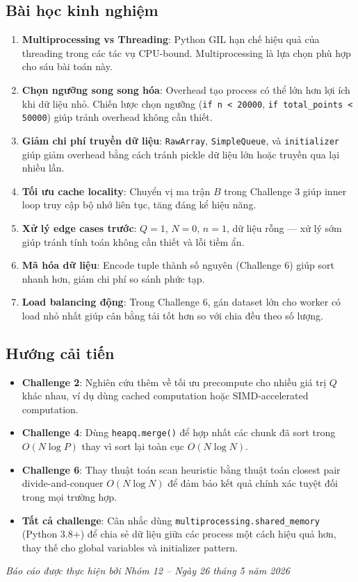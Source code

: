 \documentclass[12pt,a4paper]{article}
\begin{document}
\subsection{Bài học kinh nghiệm}

\begin{enumerate}
  \item \textbf{Multiprocessing vs Threading}: Python GIL hạn chế hiệu quả của threading trong các tác vụ CPU-bound. Multiprocessing là lựa chọn phù hợp cho sáu bài toán này.
  
  \item \textbf{Chọn ngưỡng song song hóa}: Overhead tạo process có thể lớn hơn lợi ích khi dữ liệu nhỏ. Chiến lược chọn ngưỡng (\texttt{if n < 20000}, \texttt{if total\_points < 50000}) giúp tránh overhead không cần thiết.
  
  \item \textbf{Giảm chi phí truyền dữ liệu}: \texttt{RawArray}, \texttt{SimpleQueue}, và \texttt{initializer} giúp giảm overhead bằng cách tránh pickle dữ liệu lớn hoặc truyền qua lại nhiều lần.
  
  \item \textbf{Tối ưu cache locality}: Chuyển vị ma trận $B$ trong Challenge 3 giúp inner loop truy cập bộ nhớ liên tục, tăng đáng kể hiệu năng.
  
  \item \textbf{Xử lý edge cases trước}: $Q=1$, $N=0$, $n=1$, dữ liệu rỗng — xử lý sớm giúp tránh tính toán không cần thiết và lỗi tiềm ẩn.
  
  \item \textbf{Mã hóa dữ liệu}: Encode tuple thành số nguyên (Challenge 6) giúp sort nhanh hơn, giảm chi phí so sánh phức tạp.
  
  \item \textbf{Load balancing động}: Trong Challenge 6, gán dataset lớn cho worker có load nhỏ nhất giúp cân bằng tải tốt hơn so với chia đều theo số lượng.
\end{enumerate}

\subsection{Hướng cải tiến}

\begin{itemize}
  \item \textbf{Challenge 2}: Nghiên cứu thêm về tối ưu precompute cho nhiều giá trị $Q$ khác nhau, ví dụ dùng cached computation hoặc SIMD-accelerated computation.
  \item \textbf{Challenge 4}: Dùng \texttt{heapq.merge()} để hợp nhất các chunk đã sort trong $O(N \log P)$ thay vì sort lại toàn cục $O(N \log N)$.
  \item \textbf{Challenge 6}: Thay thuật toán scan heuristic bằng thuật toán closest pair divide-and-conquer $O(N \log N)$ để đảm bảo kết quả chính xác tuyệt đối trong mọi trường hợp.
  \item \textbf{Tất cả challenge}: Cân nhắc dùng \texttt{multiprocessing.shared\_memory} (Python 3.8+) để chia sẻ dữ liệu giữa các process một cách hiệu quả hơn, thay thế cho global variables và initializer pattern.
\end{itemize}

\vfill
\begin{center}
\textit{Báo cáo được thực hiện bởi Nhóm 12 -- Ngày 26 tháng 5 năm 2026}
\end{center}
\end{document}
